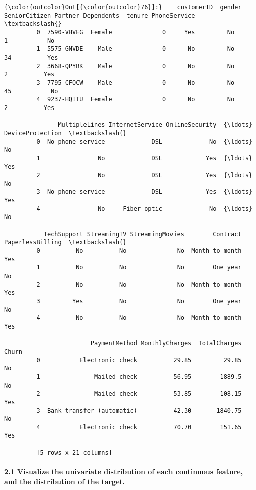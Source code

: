 \documentclass[11pt]{article}
\begin{document}
\begin{Verbatim}[commandchars=\\\{\}]
{\color{outcolor}Out[{\color{outcolor}76}]:}    customerID  gender  SeniorCitizen Partner Dependents  tenure PhoneService  \textbackslash{}
         0  7590-VHVEG  Female              0     Yes         No       1           No   
         1  5575-GNVDE    Male              0      No         No      34          Yes   
         2  3668-QPYBK    Male              0      No         No       2          Yes   
         3  7795-CFOCW    Male              0      No         No      45           No   
         4  9237-HQITU  Female              0      No         No       2          Yes   
         
               MultipleLines InternetService OnlineSecurity  {\ldots}  DeviceProtection  \textbackslash{}
         0  No phone service             DSL             No  {\ldots}                No   
         1                No             DSL            Yes  {\ldots}               Yes   
         2                No             DSL            Yes  {\ldots}                No   
         3  No phone service             DSL            Yes  {\ldots}               Yes   
         4                No     Fiber optic             No  {\ldots}                No   
         
           TechSupport StreamingTV StreamingMovies        Contract PaperlessBilling  \textbackslash{}
         0          No          No              No  Month-to-month              Yes   
         1          No          No              No        One year               No   
         2          No          No              No  Month-to-month              Yes   
         3         Yes          No              No        One year               No   
         4          No          No              No  Month-to-month              Yes   
         
                        PaymentMethod MonthlyCharges  TotalCharges Churn  
         0           Electronic check          29.85         29.85    No  
         1               Mailed check          56.95        1889.5    No  
         2               Mailed check          53.85        108.15   Yes  
         3  Bank transfer (automatic)          42.30       1840.75    No  
         4           Electronic check          70.70        151.65   Yes  
         
         [5 rows x 21 columns]
\end{Verbatim}
            
    \paragraph{2.1 Visualize the univariate distribution of each continuous
feature, and the distribution of the
target.}\label{visualize-the-univariate-distribution-of-each-continuous-feature-and-the-distribution-of-the-target.}
\end{document}
